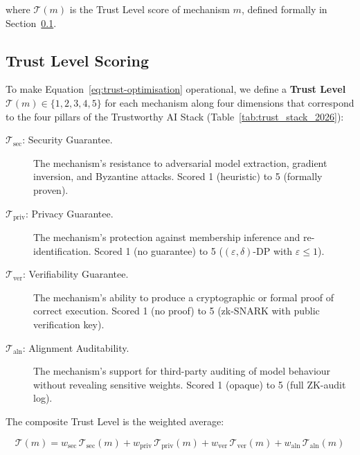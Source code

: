 where $\mathcal{T}(m)$ is the Trust Level score of mechanism $m$,
defined formally in Section~\ref{subsec:trust-level-scoring}.

\subsection{Trust Level Scoring}
\label{subsec:trust-level-scoring}

To make Equation~\eqref{eq:trust-optimisation} operational, we
define a \textbf{Trust Level} $\mathcal{T}(m) \in \{1, 2, 3, 4, 5\}$
for each mechanism along four dimensions that correspond to the
four pillars of the Trustworthy AI Stack
(Table~\ref{tab:trust_stack_2026}):

\begin{description}
  \item[$\mathcal{T}_{\mathrm{sec}}$: Security Guarantee.]
    The mechanism's resistance to adversarial model extraction,
    gradient inversion, and Byzantine attacks.
    Scored 1 (heuristic) to 5 (formally proven).

  \item[$\mathcal{T}_{\mathrm{priv}}$: Privacy Guarantee.]
    The mechanism's protection against membership inference and
    re-identification.
    Scored 1 (no guarantee) to 5 ($(\varepsilon, \delta)$-DP with
    $\varepsilon \leq 1$).

  \item[$\mathcal{T}_{\mathrm{ver}}$: Verifiability Guarantee.]
    The mechanism's ability to produce a cryptographic or formal
    proof of correct execution.
    Scored 1 (no proof) to 5 (zk-SNARK with public verification
    key).

  \item[$\mathcal{T}_{\mathrm{aln}}$: Alignment Auditability.]
    The mechanism's support for third-party auditing of model
    behaviour without revealing sensitive weights.
    Scored 1 (opaque) to 5 (full ZK-audit log).
\end{description}

The composite Trust Level is the weighted average:

\begin{equation}
  \label{eq:trust-level}
  \mathcal{T}(m)
    = w_{\mathrm{sec}}\,\mathcal{T}_{\mathrm{sec}}(m)
    + w_{\mathrm{priv}}\,\mathcal{T}_{\mathrm{priv}}(m)
    + w_{\mathrm{ver}}\,\mathcal{T}_{\mathrm{ver}}(m)
    + w_{\mathrm{aln}}\,\mathcal{T}_{\mathrm{aln}}(m)
\end{equation}

